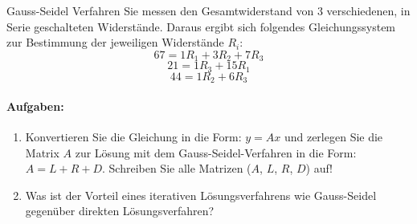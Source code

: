 \begin{example2}{Gauss-Seidel Verfahren}
Sie messen den Gesamtwiderstand von 3 verschiedenen, in Serie geschalteten Widerstände. Daraus ergibt sich folgendes Gleichungssystem zur Bestimmung der jeweiligen Widerstände $R_i$:
$$67 = 1R_1 + 3R_2 + 7R_3$$
$$21 = 1R_3 + 15R_1$$
$$44 = 1R_2 + 6R_3$$

\paragraph{Aufgaben:}
\begin{enumerate}
    \item Konvertieren Sie die Gleichung in die Form: $y = Ax$ und zerlegen Sie die Matrix $A$ zur Lösung mit dem Gauss-Seidel-Verfahren in die Form: $A = L + R + D$. Schreiben Sie alle Matrizen ($A$, $L$, $R$, $D$) auf!
        
    \item Was ist der Vorteil eines iterativen Lösungsverfahrens wie Gauss-Seidel gegenüber direkten Lösungsverfahren?
\end{enumerate}
\end{example2}


